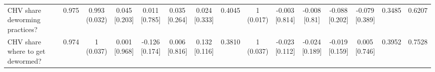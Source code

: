 {\begin{tabular}[t]{lcccccccccccccc}
\hspace{1em}CHV share deworming practices? & 0.975 & \makecell[c]{0.993\\(0.032)} & \makecell[c]{0.045\\{[0.203]}} & \makecell[c]{0.011\\{[0.785]}} & \makecell[c]{0.035\\{[0.264]}} & \makecell[c]{0.024\\{[0.333]}} & 0.4045 & \makecell[c]{1\\(0.017)} & \makecell[c]{-0.003\\{[0.814]}} & \makecell[c]{-0.008\\{[0.81]}} & \makecell[c]{-0.088\\{[0.202]}} & \makecell[c]{-0.079\\{[0.389]}} & 0.3485 & 0.6207\\
\hspace{1em}CHV share where to get dewormed? & 0.974 & \makecell[c]{1\\(0.037)} & \makecell[c]{0.001\\{[0.968]}} & \makecell[c]{-0.126\\{[0.174]}} & \makecell[c]{0.006\\{[0.816]}} & \makecell[c]{0.132\\{[0.116]}} & 0.3810 & \makecell[c]{1\\(0.037)} & \makecell[c]{-0.023\\{[0.112]}} & \makecell[c]{-0.024\\{[0.189]}} & \makecell[c]{-0.019\\{[0.159]}} & \makecell[c]{0.005\\{[0.746]}} & 0.3952 & 0.7528\\
\bottomrule
\end{tabular}}

